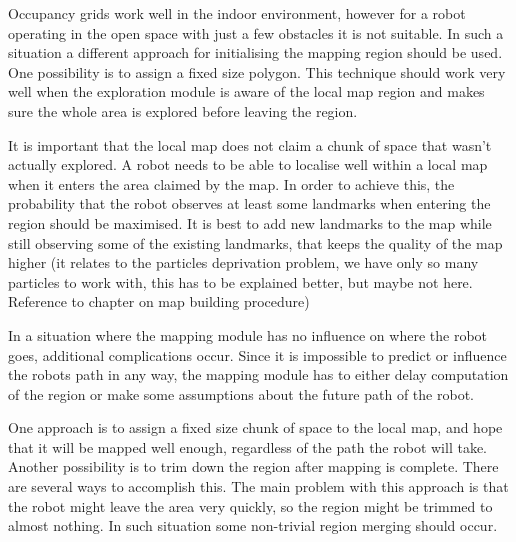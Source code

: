 Occupancy grids work well in the indoor environment, however for a
robot operating in the open space with just a few obstacles it is not
suitable. In such a situation a different approach for initialising
the mapping region should be used. One possibility is to assign a
fixed size polygon. This technique should work very well when the
exploration module is aware of the local map region and makes sure the
whole area is explored before leaving the region.

It is important that the local map does not claim a chunk of space
that wasn't actually explored. A robot needs to be able to localise
well within a local map when it enters the area claimed by the map. In
order to achieve this, the probability that the robot observes at
least some landmarks when entering the region should be maximised. It
is best to add new landmarks to the map while still observing some of
the existing landmarks, that keeps the quality of the map higher (it
relates to the particles deprivation problem, we have only so many
particles to work with, this has to be explained better, but maybe not
here. Reference to chapter on map building procedure)

In a situation where the mapping module has no influence on where the
robot goes, additional complications occur. Since it is impossible to
predict or influence the robots path in any way, the mapping module
has to either delay computation of the region or make some assumptions
about the future path of the robot.

One approach is to assign a fixed size chunk of space to the local
map, and hope that it will be mapped well enough, regardless of the
path the robot will take. Another possibility is to trim down the
region after mapping is complete. There are several ways to accomplish
this. The main problem with this approach is that the robot might
leave the area very quickly, so the region might be trimmed to almost
nothing. In such situation some non-trivial region merging should
occur.



